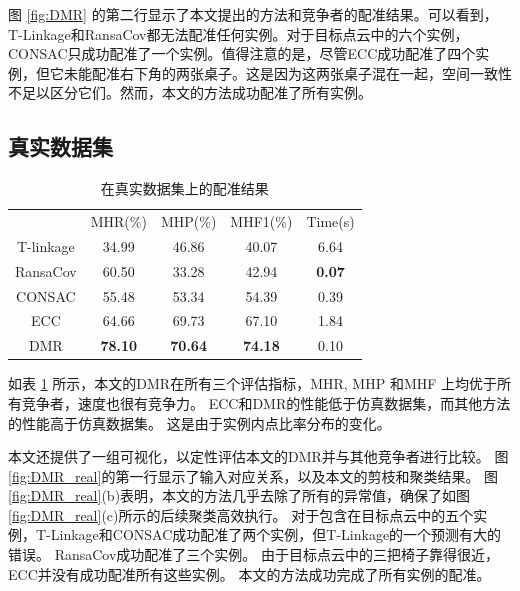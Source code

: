 图 \ref{fig:DMR} 的第二行显示了本文提出的方法和竞争者的配准结果。可以看到，T-Linkage和RansaCov都无法配准任何实例。对于目标点云中的六个实例，CONSAC只成功配准了一个实例。值得注意的是，尽管ECC成功配准了四个实例，但它未能配准右下角的两张桌子。这是因为这两张桌子混在一起，空间一致性不足以区分它们。然而，本文的方法成功配准了所有实例。

\subsection{真实数据集}
\begin{table}[ht]
        \centering
        \caption{在真实数据集上的配准结果}
        \begin{tabular}{ccccc}
        \hline\noalign{\smallskip}
        & MHR(\%)         & MHP(\%)         & MHF1(\%)         & Time(s)       \\
        \noalign{\smallskip}
        \hline
        \noalign{\smallskip}
        T-linkage  & 34.99          & 46.86          & 40.07          & 6.64          \\
        RansaCov   & 60.50          & 33.28          & 42.94          & \textbf{0.07} \\
        CONSAC     & 55.48          & 53.34          & 54.39          & 0.39          \\
        ECC        & 64.66          & 69.73          & 67.10          & 1.84          \\
        DMR   & \textbf{78.10} & \textbf{70.64} & \textbf{74.18} & 0.10        \\ 
        \hline
        \end{tabular}
        \label{tab:DMR_real}
\end{table}
      
如表 \ref{tab:DMR_real} 所示，本文的DMR在所有三个评估指标，MHR, MHP 和MHF 上均优于所有竞争者，速度也很有竞争力。 
ECC和DMR的性能低于仿真数据集，而其他方法的性能高于仿真数据集。 
这是由于实例内点比率分布的变化。 
      
本文还提供了一组可视化，以定性评估本文的DMR并与其他竞争者进行比较。 
图 \ref{fig:DMR_real}的第一行显示了输入对应关系，以及本文的剪枝和聚类结果。 
图 \ref{fig:DMR_real}(b)表明，本文的方法几乎去除了所有的异常值，确保了如图 \ref{fig:DMR_real}(c)所示的后续聚类高效执行。 
对于包含在目标点云中的五个实例，T-Linkage和CONSAC成功配准了两个实例，但T-Linkage的一个预测有大的错误。 
RansaCov成功配准了三个实例。 
由于目标点云中的三把椅子靠得很近，ECC并没有成功配准所有这些实例。 
本文的方法成功完成了所有实例的配准。
      
